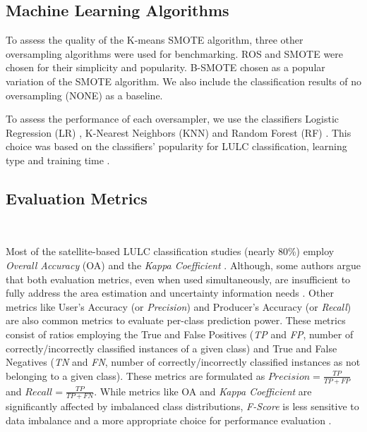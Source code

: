 \documentclass[information,article,submit,moreauthors,pdftex]{Definitions/mdpi}
\begin{document}
\begin{paracol}{2}
\linenumbers
\switchcolumn

\subsection{Machine Learning Algorithms}

To assess the quality of the K-means SMOTE algorithm,
three other oversampling algorithms were used for benchmarking. ROS and SMOTE
were chosen for their simplicity and popularity. B-SMOTE chosen as a popular
variation of the SMOTE algorithm. We also include the classification results
of no oversampling (NONE) as a baseline.

To assess the performance of each oversampler, we use the classifiers Logistic
Regression (LR) \citep{Nelder1972}, K-Nearest Neighbors (KNN)
\citep{Cover1967} and Random Forest (RF)
\citep{Liaw2002}. This choice was based on the classifiers' popularity for LULC
classification, learning type and training time \citep{Maxwell2018,Gavade2019}.

\subsection{Evaluation Metrics}~\label{sec:evaluation-metrics}

Most of the satellite-based LULC classification studies (nearly 80\%) employ
\textit{Overall Accuracy} (OA) and the \textit{Kappa Coefficient}
\citep{Gavade2019}. Although, some authors argue that both evaluation metrics,
even when used simultaneously, are insufficient to fully address the area
estimation and uncertainty information needs \citep{Olofsson2013,Pontius2011}.
Other metrics like User's Accuracy (or \textit{Precision}) and Producer's
Accuracy (or \textit{Recall}) are also common metrics to evaluate per-class
prediction power. These metrics consist of ratios employing the True and False
Positives (\textit{TP} and \textit{FP}, number of correctly/incorrectly
classified instances of a given class) and True and
False Negatives (\textit{TN} and \textit{FN}, number of correctly/incorrectly
classified instances as not belonging to a given
class). These metrics are formulated as $Precision = \frac{TP}{TP+FP}$ and
$Recall = \frac{TP}{TP+FN}$. While metrics like OA and \textit{Kappa
Coefficient} are significantly affected by imbalanced class distributions,
\textit{F-Score} is less sensitive to data imbalance and a more appropriate
choice for performance evaluation \citep{Jeni2013}.


\end{paracol}
\end{document}
